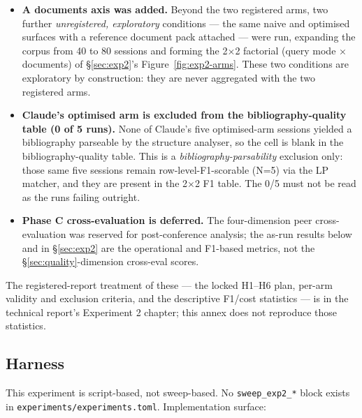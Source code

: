 \documentclass[a4paper,11pt]{article}
\providecommand{\tightlist}{%
  \setlength{\itemsep}{0pt}\setlength{\parskip}{0pt}}
\begin{document}
\begin{itemize}
\tightlist
\item
  \textbf{A documents axis was added.} Beyond the two registered arms,
  two further \emph{unregistered, exploratory} conditions --- the same
  naive and optimised surfaces with a reference document pack attached
  --- were run, expanding the corpus from 40 to 80 sessions and forming
  the 2×2 factorial (query mode × documents) of §\ref{sec:exp2}'s
  Figure~\ref{fig:exp2-arms}. These two conditions are exploratory by
  construction: they are never aggregated with the two registered arms.
\item
  \textbf{Claude's optimised arm is excluded from the
  bibliography-quality table (0 of 5 runs).} None of Claude's five
  optimised-arm sessions yielded a bibliography parseable by the
  structure analyser, so the cell is blank in the bibliography-quality
  table. This is a \emph{bibliography-parsability} exclusion only: those
  same five sessions remain row-level-F1-scorable (N=5) via the LP
  matcher, and they are present in the 2×2 F1 table. The 0/5 must not be
  read as the runs failing outright.
\item
  \textbf{Phase C cross-evaluation is deferred.} The four-dimension peer
  cross-evaluation was reserved for post-conference analysis; the as-run
  results below and in §\ref{sec:exp2} are the operational and F1-based
  metrics, not the §\ref{sec:quality}-dimension cross-eval scores.
\end{itemize}

The registered-report treatment of these --- the locked H1--H6 plan,
per-arm validity and exclusion criteria, and the descriptive F1/cost
statistics --- is in the technical report's Experiment 2 chapter; this
annex does not reproduce those statistics.

\subsection*{Harness}

This experiment is script-based, not sweep-based. No
\texttt{sweep\_exp2\_*} block exists in
\texttt{experiments/experiments.toml}. Implementation surface:
\end{document}
